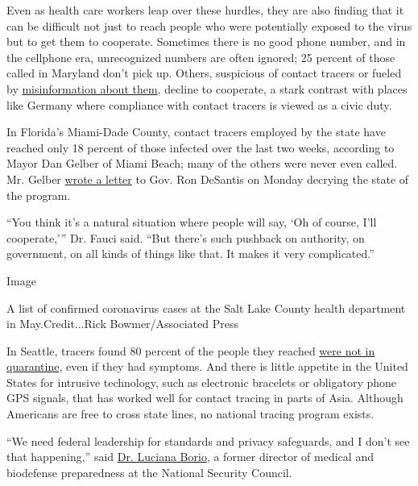 Even as health care workers leap over these hurdles, they are also
finding that it can be difficult not just to reach people who were
potentially exposed to the virus but to get them to cooperate. Sometimes
there is no good phone number, and in the cellphone era, unrecognized
numbers are often ignored; 25 percent of those called in Maryland don't
pick up. Others, suspicious of contact tracers or fueled by
\href{https://www.npr.org/sections/health-shots/2020/07/14/890628203/conspiracy-theories-aside-heres-what-contact-tracers-really-do}{misinformation
about them}, decline to cooperate, a stark contrast with places like
Germany where compliance with contact tracers is viewed as a civic duty.

In Florida's Miami-Dade County, contact tracers employed by the state
have reached only 18 percent of those infected over the last two weeks,
according to Mayor Dan Gelber of Miami Beach; many of the others were
never even called. Mr. Gelber
\href{https://twitter.com/CBoomerVazquez/status/1287841499422629889?ref_src=twsrc\%5Etfw\%7Ctwcamp\%5Etweetembed\%7Ctwterm\%5E1287850787830468613\%7Ctwgr\%5E\&ref_url=https\%3A\%2F\%2Fwww.local10.com\%2Fnews\%2Flocal\%2F2020\%2F07\%2F27\%2Fcoronavirus-in-miami-dade-contact-tracing-failures-and-talk-of-how-to-spend-federal-money\%2F}{wrote
a letter} to Gov. Ron DeSantis on Monday decrying the state of the
program.

``You think it's a natural situation where people will say, `Oh of
course, I'll cooperate,''' Dr. Fauci said. ``But there's such pushback
on authority, on government, on all kinds of things like that. It makes
it very complicated.''

Image

A list of confirmed coronavirus cases at the Salt Lake County health
department in May.Credit...Rick Bowmer/Associated Press

In Seattle, tracers found 80 percent of the people they reached
\href{https://komonews.com/news/coronavirus/only-1-in-5-isolating-when-covid-symptoms-develop-king-county-says}{were
not in quarantine}, even if they had symptoms. And there is little
appetite in the United States for intrusive technology, such as
electronic bracelets or obligatory phone GPS signals, that has worked
well for contact tracing in parts of Asia. Although Americans are free
to cross state lines, no national tracing program exists.

``We need federal leadership for standards and privacy safeguards, and I
don't see that happening,'' said
\href{http://leighbureau.com/speakers/lborio}{Dr. Luciana Borio}, a
former director of medical and biodefense preparedness at the National
Security Council.

